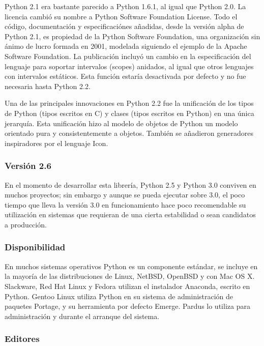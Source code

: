 \documentclass[a4paper,spanish,12pt]{book}
\begin{document}
Python 2.1 era bastante parecido a Python 1.6.1, al igual que Python 2.0. La licencia cambió su nombre a Python Software Foundation License. Todo el código, documentación y especificaciónes añadidas, desde la versión alpha de Python 2.1, es propiedad de la Python Software Foundation, una organización sin ánimo de lucro formada en 2001, modelada siguiendo el ejemplo de la Apache Software Foundation. La publicación incluyó un cambio en la especificación del lenguaje para soportar intervalos (scopes) anidados, al igual que otros lenguajes con intervalos estáticos. Esta función estaría desactivada por defecto y no fue necesaria hasta Python 2.2.

Una de las principales innovaciones en Python 2.2 fue la unificación de los tipos de Python (tipos escritos en C) y clases (tipos escritos en Python) en una única jerarquía. Esta unificación hizo al modelo de objetos de Python un modelo orientado pura y consistentemente a objetos. Tambi\'en se añadieron generadores inspiradores por el lenguaje Icon.

\subsubsection{Versión 2.6}

En el momento de desarrollar esta librería, Python 2.5 y Python 3.0 conviven en muchos proyectos; sin embargo y aunque se pueda ejecutar sobre 3.0, el poco tiempo que lleva la versión 3.0 en funcionamiento hace poco recomendable su utilización en sistemas que requieran de una cierta estabilidad o sean candidatos a producción.

\subsubsection{Disponibilidad}

En muchos sistemas operativos Python es un componente estándar, se incluye en la mayoría de las distribuciones de Linux, NetBSD, OpenBSD y con Mac OS X. Slackware, Red Hat Linux y Fedora utilizan el instalador Anaconda, escrito en Python. Gentoo Linux utiliza Python en su sistema de administración de paquetes Portage, y su herramienta por defecto Emerge. Pardus lo utiliza para administración y durante el arranque del sistema.

\subsubsection{Editores}
\end{document}
